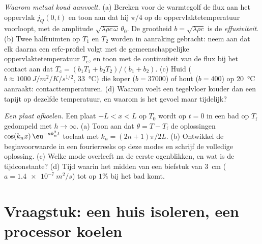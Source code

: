 \begin{exercise}[$\star\star\star$]\label{exo:b2:heat-conduction:11}
\emph{Waarom metaal koud aanvoelt.} (a) Bereken voor de warmtegolf de
flux aan het oppervlak $j_Q(0,t)$ en toon aan dat hij $\pi/4$ op de
oppervlaktetemperatuur
voorloopt, met de amplitude $\sqrt{\lambda\rho c\,\omega}\,\theta_0$. De
grootheid $b = \sqrt{\lambda\rho c}$ is de \emph{effusiviteit}. (b) Twee
halfruimten op $T_1$ en $T_2$ worden in aanraking gebracht: neem aan dat
elk daarna een erfc-profiel volgt met de gemeenschappelijke oppervlaktetemperatuur
$T_{\text{c}}$, en toon met de continuïteit van de flux bij het contact
aan dat $T_{\text{c}} = (b_1T_1 + b_2T_2)/(b_1 + b_2)$. (c) Huid
($b \approx \qty{1000}{J/m^2/K/s^{1/2}}$, \qty{33}{\celsius}) die
koper ($b = 37000$) of hout ($b = 400$) op \qty{20}{\celsius} aanraakt:
contacttemperaturen. (d) Waarom voelt een tegelvloer kouder dan een tapijt op
dezelfde temperatuur, en waarom is het gevoel maar tijdelijk?
\end{exercise}

\begin{exercise}[$\star\star\star$]\label{exo:b2:heat-conduction:12}
\emph{Een plaat afkoelen.} Een plaat $-L < x < L$ op $T_0$ wordt op $t =
0$
in een bad op $T_{\text{f}}$ gedompeld met $h \to \infty$. (a) Toon aan dat
$\theta =
T - T_{\text{f}}$ de oplossingen $\cos(k_nx)\,\eu^{-ak_n^2t}$
toelaat met $k_n
= (2n+1)\pi/2L$. (b) Ontwikkel de beginvoorwaarde in een
fourierreeks
op deze modes en schrijf de volledige oplossing. (c) Welke mode overleeft
na de eerste ogenblikken, en wat is de tijdconstante? (d) Tijd
waarin het midden van een biefstuk van \qty{3}{cm}
($a = \qty{1.4e-7}{m^2/s}$) tot op
$1\%$ bij het bad komt.
\end{exercise}

\section{Vraagstuk: een huis isoleren, een processor koelen}

